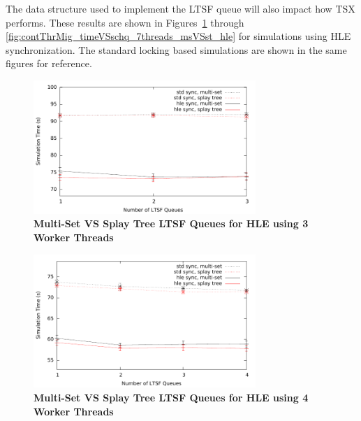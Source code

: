 \documentclass[11pt]{book}
\begin{document}
The data structure used to implement the LTSF queue will also impact how TSX
performs.  These results are shown in
Figures~\ref{fig:contThrMig_timeVSschq_3threads_msVSst_hle} through
\ref{fig:contThrMig_timeVSschq_7threads_msVSst_hle} for simulations using HLE
synchronization.  The standard locking based simulations are shown in the same
figures for reference.

\begin{figure}
    \centering
    \graphicspath{ {./figures/} }
    \includegraphics[width=0.75\textwidth,keepaspectratio]{hugeepidemicsim-CONTmig-timeVSschedQs-msVSst-3thread-hle}
\caption{\textbf{Multi-Set VS Splay Tree LTSF Queues for HLE
     using 3 Worker Threads}}\label{fig:contThrMig_timeVSschq_3threads_msVSst_hle}
\end{figure}

\begin{figure}
    \centering
    \graphicspath{ {./figures/} }
    \includegraphics[width=0.75\textwidth,keepaspectratio]{hugeepidemicsim-CONTmig-timeVSschedQs-msVSst-4thread-hle}
\caption{\textbf{Multi-Set VS Splay Tree LTSF Queues for HLE
     using 4 Worker Threads}}\label{fig:contThrMig_timeVSschq_4threads_msVSst_hle}
\end{figure}
\end{document}
